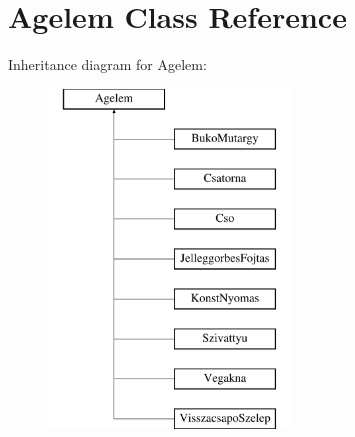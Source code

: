 \hypertarget{class_agelem}{}\section{Agelem Class Reference}
\label{class_agelem}
Inheritance diagram for Agelem\+:\begin{figure}[H]
\begin{center}
\leavevmode
\includegraphics[height=9.000000cm]{class_agelem}
\end{center}
\end{figure}
